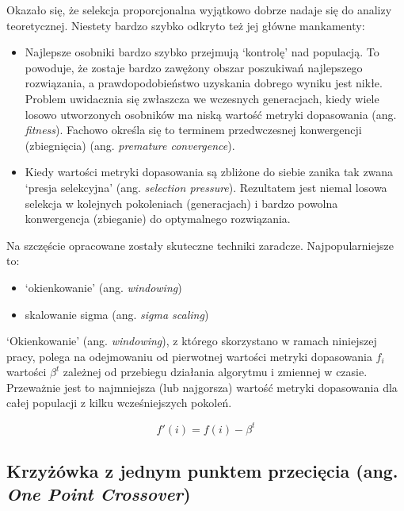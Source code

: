 \documentclass[a4paper,11pt]{article}
\begin{document}
    \bigskip

    Okazało się, że selekcja proporcjonalna wyjątkowo dobrze nadaje się do analizy teoretycznej. Niestety bardzo szybko odkryto też jej główne mankamenty\cite{IntroductionToEvolutionaryComputing2015}:
    \begin{itemize}
        \item Najlepsze osobniki bardzo szybko przejmują `kontrolę' nad populacją. To powoduje, że zostaje bardzo zawężony obszar poszukiwań najlepszego rozwiązania, a prawdopodobieństwo uzyskania dobrego wyniku jest nikłe. Problem uwidacznia się zwłaszcza we wczesnych generacjach, kiedy wiele losowo utworzonych osobników ma niską wartość metryki dopasowania (ang. \textit{fitness}). Fachowo określa się to terminem przedwczesnej konwergencji (zbiegnięcia) (ang. \textit{premature convergence}).
        \item Kiedy wartości metryki dopasowania są zbliżone do siebie zanika tak zwana `presja selekcyjna' (ang. \textit{selection pressure}). Rezultatem jest niemal losowa selekcja w kolejnych pokoleniach (generacjach) i bardzo powolna konwergencja (zbieganie) do optymalnego rozwiązania.
    \end{itemize}

    \bigskip

    Na szczęście opracowane zostały skuteczne techniki zaradcze. Najpopularniejsze to:
    \begin{itemize}
        \item `okienkowanie' (ang. \textit{windowing})
        \item skalowanie sigma (ang. \textit{sigma scaling})
    \end{itemize}

    \bigskip

    `Okienkowanie' (ang. \textit{windowing}), z którego skorzystano w ramach niniejszej pracy, polega na odejmowaniu od pierwotnej wartości metryki dopasowania  $f_{i}$ wartości $\beta^{t}$ zależnej od przebiegu działania algorytmu i zmiennej w czasie. Przeważnie jest to najmniejsza (lub najgorsza) wartość metryki dopasowania dla całej populacji z kilku wcześniejszych pokoleń\cite{IntroductionToEvolutionaryComputing2015}.

    \bigskip

    \begin{equation}
        \label{equ:new_fitness}
        f'(i) = f(i) - \beta^{t}
    \end{equation}

    \subsection{Krzyżówka z jednym punktem przecięcia (ang. \textit{One Point Crossover})}
\end{document}
